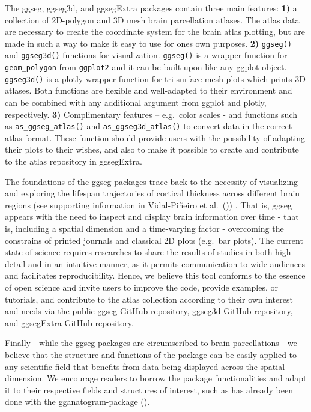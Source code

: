 \documentclass[fleqn,10pt]{wlpeerj} %
\begin{document}
The ggseg, ggseg3d, and ggsegExtra packages contain three main features:
\textbf{1)} a collection of 2D-polygon and 3D mesh brain parcellation atlases. The atlas data are necessary to create the coordinate system for the brain atlas plotting, but are made in such a way to make it easy to use for ones own purposes.
\textbf{2)} \texttt{ggseg()} and \texttt{ggseg3d()} functions for visualization.
\texttt{ggseg()} is a wrapper function for \texttt{geom\_polygon} from \texttt{ggplot2} and it can be built upon like any ggplot object.
\texttt{ggseg3d()} is a plotly wrapper function for tri-surface mesh plots which prints 3D atlases.
Both functions are flexible and well-adapted to their environment and can be combined with any additional argument from ggplot and plotly, respectively.
\textbf{3)} Complimentary features -- e.g.~color scales - and functions such as \texttt{as\_ggseg\_atlas()} and \texttt{as\_ggseg3d\_atlas()} to convert data in the correct atlas format. These function should provide users with the possibility of adapting their plots to their wishes, and also to make it possible to create and contribute to the atlas repository in ggsegExtra.

The foundations of the ggseg-packages trace back to the necessity of visualizing and exploring the lifespan trajectories of cortical thickness across different brain regions (see supporting information in Vidal-Piñeiro et al.~(\citeyearpar{vidal_2019})) .
That is, ggseg appears with the need to inspect and display brain information over time - that is, including a spatial dimension and a time-varying factor - overcoming the constrains of printed journals and classical 2D plots (e.g.~bar plots).
The current state of science requires researches to share the results of studies in both high detail and in an intuitive manner, as it permits communication to wide audiences and facilitates reproducibility.
Hence, we believe this tool conforms to the essence of open science and invite users to improve the code, provide examples, or tutorials, and contribute to the atlas collection according to their own interest and needs via the public \href{https://github.com/LCBC-UiO/ggseg}{ggseg GitHub repository}, \href{https://github.com/LCBC-UiO/ggseg3d}{ggseg3d GitHub repository}, and \href{https://github.com/LCBC-UiO/ggsegExtra}{ggsegExtra GitHub repository}.

Finally - while the ggseg-packages are circumscribed to brain parcellations - we believe that the structure and functions of the package can be easily applied to any scientific field that benefits from data being displayed across the spatial dimension.
We encourage readers to borrow the package functionalities and adapt it to their respective fields and structures of interest, such as has already been done with the gganatogram-package (\citet{gganatogram}).
\end{document}
